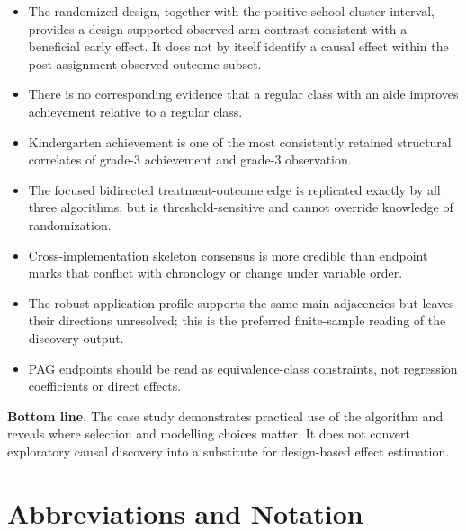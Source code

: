 \documentclass[11pt,a4paper,oneside]{report}
\begin{document}
\begin{itemize}[leftmargin=2em]
  \item The randomized design, together with the positive school-cluster
        interval, provides a design-supported observed-arm contrast consistent
        with a beneficial early effect. It does not by itself identify a
        causal effect within the post-assignment observed-outcome subset.
  \item There is no corresponding evidence that a regular class with an aide
        improves achievement relative to a regular class.
  \item Kindergarten achievement is one of the most consistently retained
        structural correlates of grade-3 achievement and grade-3 observation.
  \item The focused bidirected treatment-outcome edge is replicated exactly by
        all three algorithms, but is threshold-sensitive and cannot override
        knowledge of randomization.
  \item Cross-implementation skeleton consensus is more credible than endpoint
        marks that conflict with chronology or change under variable order.
  \item The robust application profile supports the same main adjacencies but
        leaves their directions unresolved; this is the preferred
        finite-sample reading of the discovery output.
  \item PAG endpoints should be read as equivalence-class constraints, not
        regression coefficients or direct effects.
\end{itemize}

\textbf{Bottom line.} The case study demonstrates practical use of the
algorithm and reveals where selection and modelling choices matter. It does
not convert exploratory causal discovery into a substitute for design-based
effect estimation.

\normalsize
\tableofcontents
\listoffigures
\listoftables

\chapter*{Abbreviations and Notation}
\end{document}
